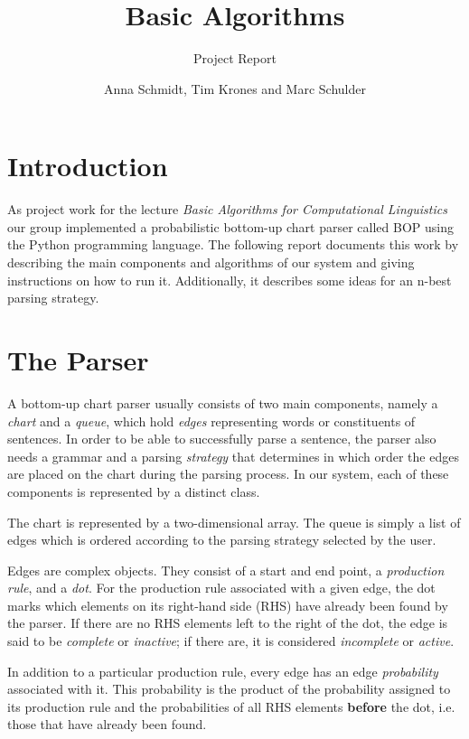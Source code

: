 \documentclass[11pt, titlepage, a4paper]{scrartcl}		%
\begin{document}
\title{Basic Algorithms}
\subtitle{Project Report}
\author{Anna Schmidt, Tim Krones and Marc Schulder}
\maketitle

\section{Introduction}
\label{sec:intro}
As project work for the lecture \emph{Basic Algorithms for Computational Linguistics} our group implemented a probabilistic bottom-up chart parser called BOP using the Python programming language. The following report documents this work by describing the main components and algorithms of our system and giving instructions on how to run it. Additionally, it describes some ideas for an n-best parsing strategy.


\section{The Parser}
\label{sec:basic}
A bottom-up chart parser usually consists of two main components, namely a \emph{chart} and a \emph{queue}, which hold \emph{edges} representing words or constituents of sentences. In order to be able to successfully parse a sentence, the parser also needs a grammar and a parsing \emph{strategy} that determines in which order the edges are placed on the chart during the parsing process. In our system, each of these components is represented by a distinct class.

The chart is represented by a two-dimensional array. The queue is simply a list of edges which is ordered according to the parsing strategy selected by the user.

Edges are complex objects. They consist of a start and end point, a \emph{production rule}, and a \emph{dot}. For the production rule associated with a given edge, the dot marks which elements on its right-hand side (RHS) have already been found by the parser. If there are no RHS elements left to the right of the dot, the edge is said to be \emph{complete} or \emph{inactive}; if there are, it is considered \emph{incomplete} or \emph{active}.

In addition to a particular production rule, every edge has an edge \emph{probability} associated with it. This probability is the product of the probability assigned to its production rule and the probabilities of all RHS elements \textbf{before} the dot, i.e. those that have already been found.
\end{document}
